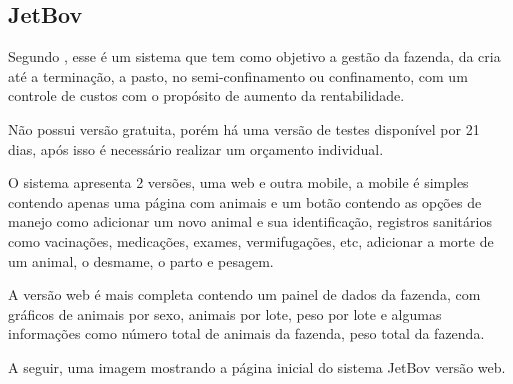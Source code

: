 \documentclass[12pt]{article}
\begin{document}




	\newpage


	\subsection{JetBov}

	Segundo , esse é um sistema que tem como objetivo a gestão da fazenda, da cria até a terminação, a pasto, no semi-confinamento ou confinamento, com um controle de custos com o propósito de aumento da rentabilidade. 

	Não possui versão gratuita, porém há uma versão de testes disponível por 21 dias, após isso é necessário realizar um orçamento individual.

	O sistema apresenta 2 versões, uma web e outra mobile, a mobile é simples contendo apenas uma página com animais e um botão contendo as opções de manejo como adicionar um novo animal e sua identificação, registros sanitários como vacinações, medicações, exames, vermifugações, etc, adicionar a morte de um animal, o desmame, o parto e pesagem.

	A versão web é mais completa contendo um painel de dados da fazenda, com gráficos de animais por sexo, animais por lote, peso por lote e algumas informações como número total de animais da fazenda, peso total da fazenda. 

	A seguir, uma imagem mostrando a página inicial do sistema JetBov versão web.
\end{document}
